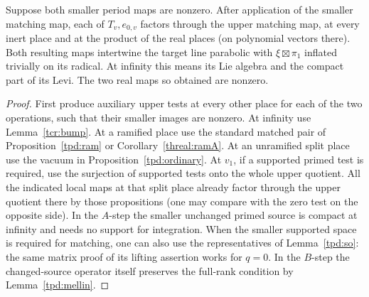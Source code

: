 \begin{proposition}\label{tcr:descend}
Suppose both smaller period maps are nonzero. After application of
the smaller matching map, each of \(T_v,e_{0,v}\) factors through
the upper matching map, at every inert place and at the product of
the real places (on polynomial vectors there). Both resulting maps
intertwine the target line parabolic with
\(\xi\boxtimes\pi_1\) inflated trivially on its radical.
At infinity this means its Lie algebra and the compact part of its
Levi. The two real maps so obtained are nonzero.
\end{proposition}
\begin{proof}
First produce auxiliary upper tests at every other place for each
of the two operations, such that their smaller images are nonzero.
At infinity use Lemma~\ref{tcr:bump}. At a ramified place use the
standard matched pair of Proposition~\ref{tpd:ram} or
Corollary~\ref{threal:ramA}. At an unramified split place use the
vacuum in Proposition~\ref{tpd:ordinary}. At \(v_1\), if a
supported primed test is required, use the surjection of supported
tests onto the whole upper quotient. All the indicated local maps
at that split place already factor through the upper quotient
there by those propositions (one may compare with the zero test on
the opposite side). In the \(A\)-step the smaller unchanged primed
source is compact at infinity and needs no support for integration.
When the smaller supported space is required for matching, one
can also use the representatives of Lemma~\ref{tpd:so}: the same
matrix proof of its lifting assertion works for \(q=0\).
In the \(B\)-step the changed-source operator itself preserves the
full-rank condition by Lemma~\ref{tpd:mellin}.


\end{proof}
